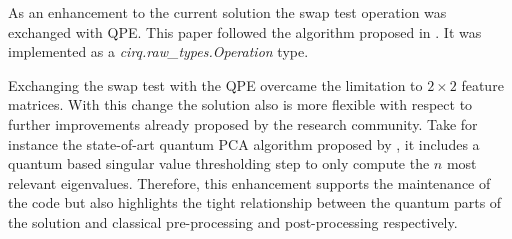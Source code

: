 As an enhancement to the current solution the swap test operation was exchanged with QPE. This paper followed the algorithm proposed in \cite{Qtb_Qpe}. It was implemented as a \emph{cirq.raw\_types.Operation} type.

Exchanging the swap test with the QPE overcame the limitation to $2 \times 2$ feature matrices. With this change the solution also is more flexible with respect to further improvements already proposed by the research community. Take for instance the state-of-art quantum PCA algorithm proposed by \cite{He_2021}, it includes a quantum based singular value thresholding step to only compute the $n$ most relevant eigenvalues. Therefore, this enhancement supports the maintenance of the code but also highlights the tight relationship between the quantum parts of the solution and classical pre-processing and post-processing respectively.

